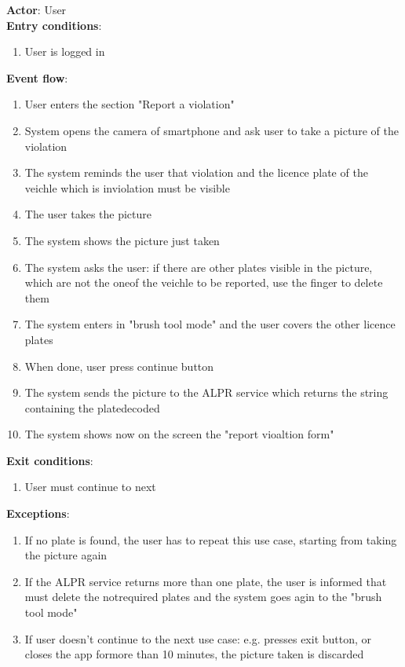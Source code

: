   \textbf{Actor}: User   \\
  \textbf{Entry conditions}:
  \begin{enumerate}
    \item{User is logged in}
  \end{enumerate}
  \textbf{Event flow}:
  \begin{enumerate}
    \item{User enters the section "Report a violation"}
    \item{System opens the camera of smartphone and ask user to take a picture of the violation}
    \item{The system reminds the user that violation and the licence plate of the veichle which is inviolation must be visible }
    \item{The user takes the picture }
    \item{The system shows the picture just taken }
    \item{The system asks the user: if there are other plates visible in the picture, which are not the oneof the veichle to be reported, use the finger to delete them }
    \item{The system enters in "brush tool mode" and the user covers the other licence plates}
    \item{When done, user press continue button}
    \item{The system sends the picture to the ALPR service which returns the string containing the platedecoded}
    \item{The system shows now on the screen the "report vioaltion form"}
  \end{enumerate}
  \textbf{Exit conditions}:
  \begin{enumerate}
    \item{User must continue to next }
  \end{enumerate}
  \textbf{Exceptions}:
  \begin{enumerate}
    \item{If no plate is found, the user has to repeat this use case, starting from taking the picture again}
    \item{If the ALPR service returns more than one plate, the user is informed that must delete the notrequired plates and the system goes agin to the "brush tool mode"}
    \item{If user doesn't continue to the next use case: e.g. presses exit button, or closes the app formore than 10 minutes, the picture taken is discarded}
  \end{enumerate}
